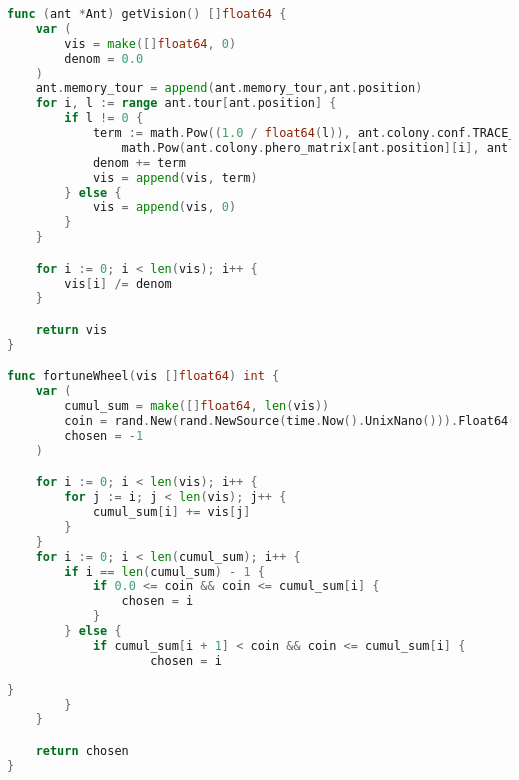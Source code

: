 \begin{lstlisting}[language=Go, label=lst:alg:Parallel3, caption=Реализация функций для рассчета перемещений муравья]
func (ant *Ant) getVision() []float64 {
    var (
        vis = make([]float64, 0)
        denom = 0.0
    )
    ant.memory_tour = append(ant.memory_tour,ant.position)
    for i, l := range ant.tour[ant.position] {
        if l != 0 {
            term := math.Pow((1.0 / float64(l)), ant.colony.conf.TRACE_WEIGHT) * +
                math.Pow(ant.colony.phero_matrix[ant.position][i], ant.colony.conf.TOUR_VISIB)
            denom += term
            vis = append(vis, term)
        } else {
            vis = append(vis, 0)
        }
    }

    for i := 0; i < len(vis); i++ {
        vis[i] /= denom
    }

    return vis
}

func fortuneWheel(vis []float64) int {
    var (
        cumul_sum = make([]float64, len(vis))
        coin = rand.New(rand.NewSource(time.Now().UnixNano())).Float64()
        chosen = -1
    )

    for i := 0; i < len(vis); i++ {
        for j := i; j < len(vis); j++ {
            cumul_sum[i] += vis[j]
        }
    }
    for i := 0; i < len(cumul_sum); i++ {
        if i == len(cumul_sum) - 1 {
            if 0.0 <= coin && coin <= cumul_sum[i] {
                chosen = i
            }
        } else {
            if cumul_sum[i + 1] < coin && coin <= cumul_sum[i] {
                    chosen = i
\end{lstlisting}

\begin{lstlisting}[language=Go, label=lst:alg:Parallel4, caption=Реализация функций для рассчета перемещений муравья]
            }
        }
    }

    return chosen
}
\end{lstlisting}
\par \text{  }

